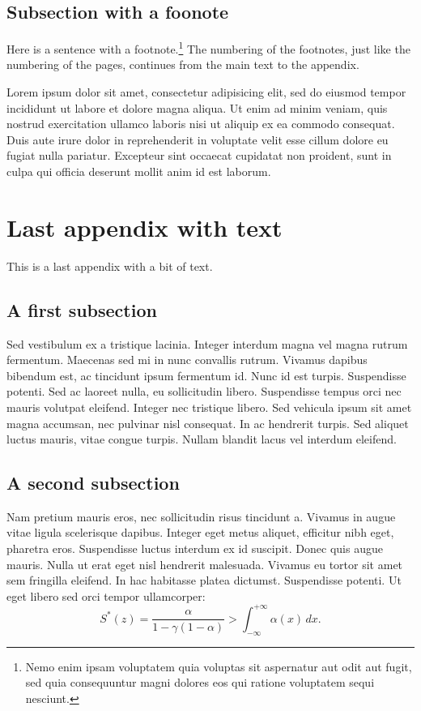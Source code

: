 \documentclass[letterpaper,11pt,leqno]{article}
\begin{document}
\subsection{Subsection with a foonote}

Here is a sentence with a footnote.\footnote{Nemo enim ipsam voluptatem quia voluptas sit aspernatur aut odit aut fugit, sed quia consequuntur magni dolores eos qui ratione voluptatem sequi nesciunt.} The numbering of the footnotes, just like the numbering of the pages, continues from the main text to the appendix.

Lorem ipsum dolor sit amet, consectetur adipisicing elit, sed do eiusmod tempor incididunt ut labore et dolore magna aliqua. Ut enim ad minim veniam,
quis nostrud exercitation ullamco laboris nisi ut aliquip ex ea commodo
consequat. Duis aute irure dolor in reprehenderit in voluptate velit esse
cillum dolore eu fugiat nulla pariatur. Excepteur sint occaecat cupidatat non
proident, sunt in culpa qui officia deserunt mollit anim id est laborum.

\section{Last appendix with text}

This is a last appendix with a bit of text.

\subsection{A first subsection}

Sed vestibulum ex a tristique lacinia. Integer interdum magna vel magna rutrum fermentum. Maecenas sed mi in nunc convallis rutrum. Vivamus dapibus bibendum est, ac tincidunt ipsum fermentum id. Nunc id est turpis. Suspendisse potenti. Sed ac laoreet nulla, eu sollicitudin libero. Suspendisse tempus orci nec mauris volutpat eleifend. Integer nec tristique libero. Sed vehicula ipsum sit amet magna accumsan, nec pulvinar nisl consequat. In ac hendrerit turpis. Sed aliquet luctus mauris, vitae congue turpis. Nullam blandit lacus vel interdum eleifend. 

\subsection{A second subsection}

Nam pretium mauris eros, nec sollicitudin risus tincidunt a. Vivamus in augue vitae ligula scelerisque dapibus. Integer eget metus aliquet, efficitur nibh eget, pharetra eros. Suspendisse luctus interdum ex id suscipit. Donec quis augue mauris. Nulla ut erat eget nisl hendrerit malesuada. Vivamus eu tortor sit amet sem fringilla eleifend. In hac habitasse platea dictumst. Suspendisse potenti. Ut eget libero sed orci tempor ullamcorper:
\begin{equation}
S^*(z) = \frac{\alpha}{1-\gamma (1-\alpha)} > \int_{-\infty}^{+\infty}\alpha(x)\,dx.
\label{e:type1Classical}\end{equation}
\end{document}
